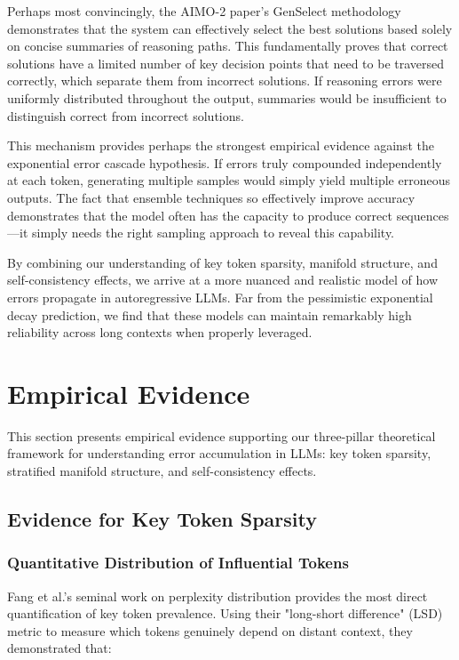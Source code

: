 \documentclass{article}
\begin{document}
Perhaps most convincingly, the AIMO-2 paper's GenSelect methodology demonstrates that the system can effectively select the best solutions based solely on concise summaries of reasoning paths. This fundamentally proves that correct solutions have a limited number of key decision points that need to be traversed correctly, which separate them from incorrect solutions. If reasoning errors were uniformly distributed throughout the output, summaries would be insufficient to distinguish correct from incorrect solutions.

This mechanism provides perhaps the strongest empirical evidence against the exponential error cascade hypothesis. If errors truly compounded independently at each token, generating multiple samples would simply yield multiple erroneous outputs. The fact that ensemble techniques so effectively improve accuracy demonstrates that the model often has the capacity to produce correct sequences—it simply needs the right sampling approach to reveal this capability.

By combining our understanding of key token sparsity, manifold structure, and self-consistency effects, we arrive at a more nuanced and realistic model of how errors propagate in autoregressive LLMs. Far from the pessimistic exponential decay prediction, we find that these models can maintain remarkably high reliability across long contexts when properly leveraged.

\section{Empirical Evidence}

This section presents empirical evidence supporting our three-pillar theoretical framework for understanding error accumulation in LLMs: key token sparsity, stratified manifold structure, and self-consistency effects.

\subsection{Evidence for Key Token Sparsity}

\subsubsection{Quantitative Distribution of Influential Tokens}

Fang et al.'s \citep{fang2024what} seminal work on perplexity distribution provides the most direct quantification of key token prevalence. Using their "long-short difference" (LSD) metric to measure which tokens genuinely depend on distant context, they demonstrated that:
\end{document}
